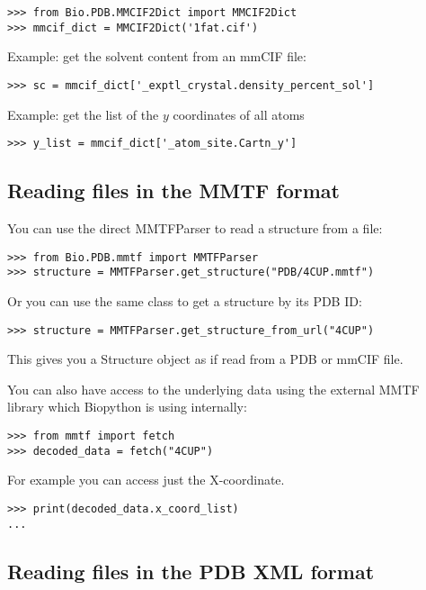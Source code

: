 \begin{verbatim}
>>> from Bio.PDB.MMCIF2Dict import MMCIF2Dict
>>> mmcif_dict = MMCIF2Dict('1fat.cif')
\end{verbatim}

Example: get the solvent content from an mmCIF file:
\begin{verbatim}
>>> sc = mmcif_dict['_exptl_crystal.density_percent_sol']
\end{verbatim}

Example: get the list of the $y$ coordinates of all atoms
\begin{verbatim}
>>> y_list = mmcif_dict['_atom_site.Cartn_y']
\end{verbatim}


\subsection{Reading files in the MMTF format}

You can use the direct MMTFParser to read a structure from a file:
\begin{verbatim}
>>> from Bio.PDB.mmtf import MMTFParser
>>> structure = MMTFParser.get_structure("PDB/4CUP.mmtf")
\end{verbatim}

Or you can use the same class to get a structure by its PDB ID:
\begin{verbatim}
>>> structure = MMTFParser.get_structure_from_url("4CUP")
\end{verbatim}

This gives you a Structure object as if read from a PDB or mmCIF file.

You can also have access to the underlying data using the external
MMTF library which Biopython is using internally:
\begin{verbatim}
>>> from mmtf import fetch
>>> decoded_data = fetch("4CUP")
\end{verbatim}
For example you can access just the X-coordinate.
\begin{verbatim}
>>> print(decoded_data.x_coord_list)
...
\end{verbatim}

\subsection{Reading files in the PDB XML format}

